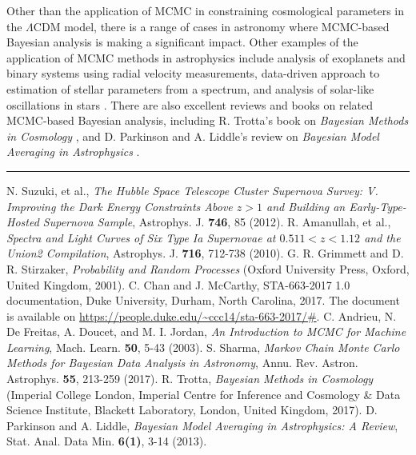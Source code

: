 \documentclass[11pt]{article}
\theoremstyle{break}
\theoremstyle{break}
\begin{document}
${}$\qquad Other than the application of MCMC in constraining cosmological parameters in the $\Lambda$CDM model, there is a range of cases in astronomy where MCMC-based Bayesian analysis is making a significant impact. Other examples of the application of MCMC methods in astrophysics include analysis of exoplanets and binary systems using radial velocity measurements, data-driven approach to estimation of stellar parameters from a spectrum, and analysis of solar-like oscillations in stars \cite{Further}. There are also excellent reviews and books on related MCMC-based Bayesian analysis, including R. Trotta's book on \textit{Bayesian Methods in Cosmology} \cite{RT}, and D. Parkinson and A. Liddle's review on \textit{Bayesian Model Averaging in Astrophysics} \cite{AL}. \\

\hfill\break

\noindent\rule{8cm}{1pt}

\begin{thebibliography}{9}
N. Suzuki, et al., \textit{The Hubble Space Telescope Cluster Supernova Survey: V. Improving the Dark Energy Constraints Above $z>1$ and Building an Early-Type-Hosted Supernova Sample}, Astrophys. J. \textbf{746}, 85 (2012).
R. Amanullah, et al., \textit{Spectra and Light Curves of Six Type Ia Supernovae at $0.511 < z < 1.12$ and the Union2 Compilation}, Astrophys. J. \textbf{716}, 712-738 (2010). 
G. R. Grimmett and D. R. Stirzaker, \textit{Probability and Random Processes} (Oxford University Press, Oxford, United Kingdom, 2001).
C. Chan and J. McCarthy, STA-663-2017 1.0 documentation, Duke University, Durham, North Carolina, 2017. The document is available on \url{https://people.duke.edu/~ccc14/sta-663-2017/#}.
C. Andrieu, N. De Freitas, A. Doucet, and M. I. Jordan,
\textit{An Introduction to MCMC for Machine Learning}, Mach. Learn. \textbf{50}, 5-43 (2003).
S. Sharma, \textit{Markov Chain Monte Carlo Methods for Bayesian Data Analysis in Astronomy}, Annu. Rev. Astron. Astrophys. \textbf{55}, 213-259 (2017). 
R. Trotta, \textit{Bayesian Methods in Cosmology} (Imperial College London, Imperial Centre for Inference and Cosmology \& Data Science Institute,
Blackett Laboratory, London, United Kingdom, 2017).
D. Parkinson and A. Liddle, \textit{Bayesian Model Averaging in Astrophysics: A Review}, Stat. Anal. Data Min. \textbf{6(1)}, 3-14 (2013). 
\end{thebibliography}
\end{document}
